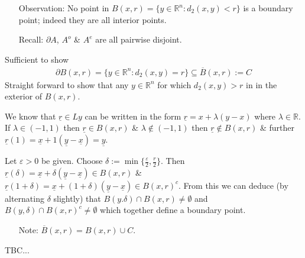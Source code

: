 \documentclass[10pt]{article}
\begin{document}
\begin{multicols}{2}

    \begin{itemize}
        \item[Observation:] No point in $B(x,r)=\{y\in\mathbb{R}^{n}:d_{2}(x,y)<r\}$ is a boundary point; indeed they are all interior points.
        \item[Recall:] $\partial A$, $A^{o}$ \& $A^{e}$ are all pairwise disjoint.
        
    \end{itemize}
    Sufficient to show
        \begin{align*}
            \boxed{\partial B(x,r)=\{y\in\mathbb{R}^{n}:d_{2}(x,y)=r\}\subseteq \overline{B}(x,r):=C}
        \end{align*}
    Straight forward to show that any $y\in\mathbb{R}^{n}$ for which $d_{2}(x,y)>r$ in in the exterior of $B(x,r)$.
\end{multicols}
We know that $\underline{r}\in Ly$ can be written in the form $\underline{r}=x+\lambda(y-x)$ where $\lambda\in\mathbb{R}$. If $\lambda\in(-1,1)$ then $\underline{r}\in B(x,r)$ \& $\lambda\notin(-1,1)$ then $\underline{r}\notin B(x,r)$ \& further $\underline{r}(1)=\underline{x}+1(\underline{y}-\underline{x})=\underline{y}$.

Let $\varepsilon>0$ be given. Choose $\delta:=\min\{\frac{\varepsilon}{2},\frac{r}{2}\}$. Then $\underline{r}(\delta)=\underline{x}+\delta(\underline{y}-\underline{x})\in B(x,r)$ \& $\underline{r}(1+\delta)=\underline{x}+(1+\delta)(\underline{y}-\underline{x})\in B(x,r)^{c}$. From this we can deduce (by alternating $\delta$ slightly) that $B(y.\delta)\cap B(x,r)\neq\emptyset$ and $B(y,\delta)\cap B(x,r)^{c}\neq\emptyset$ which together define a boundary point.
\begin{itemize}
    \item[Note:] $\boxed{\overline{B}(x,r)=B(x,r)\cup C.}$ 
\end{itemize}


TBC...
\end{document}
